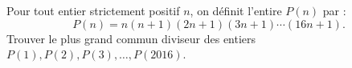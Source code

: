 \documentclass[varwidth]{standalone}
\begin{document}
    Pour tout entier strictement positif $n$, on d\'efinit l'entire $P(n)$ par :
    \[
        P(n) = n(n + 1)(2n + 1)(3n + 1) \dotsb (16n + 1).
    \]
    Trouver le plus grand commun diviseur des entiers $P(1), P(2), P(3), \dots, P(2016)$.
\end{document}
